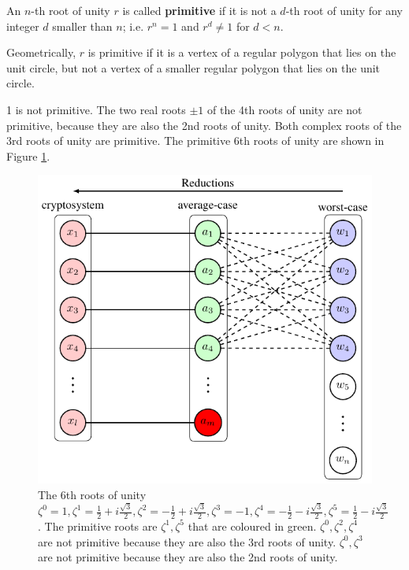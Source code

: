 \documentclass[../main.tex]{subfiles}
\begin{document}
\begin{definition}
An $n$-th root of unity $r$ is called \textbf{primitive}\reversemarginpar
{}
 if it is not a $d$-th root of unity for any integer $d$ smaller than $n$; i.e. $r^n=1$ and $r^d \neq 1$ for $d < n$. %
\end{definition}

Geometrically, $r$ is primitive if it is a vertex of a regular polygon that lies on the unit circle, but not a vertex of a smaller regular polygon that lies on the unit circle.  

\begin{example}
1 is not primitive. The two real roots $\pm 1$ of the 4th roots of unity are not primitive, because they are also the 2nd roots of unity. Both complex roots of the 3rd roots of unity are primitive. The primitive 6th roots of unity are shown in Figure \ref{fig:primitive roots}.
\end{example}

\begin{figure}[h]
    \centering
    \includegraphics[page=8]{images/Lattice_crypto_tikz_folder.pdf}
    \caption{The 6th roots of unity $\zeta^0=1,\zeta^1=\frac{1}{2}+i\frac{\sqrt{3}}{2},\zeta^2=-\frac{1}{2}+i\frac{\sqrt{3}}{2},\zeta^3=-1, \zeta^4=-\frac{1}{2}-i\frac{\sqrt{3}}{2},\zeta^5=\frac{1}{2}-i\frac{\sqrt{3}}{2}$. The primitive roots are $\zeta^1,\zeta^5$ that are coloured in green. $\zeta^0,\zeta^2,\zeta^4$ are not primitive because they are also the 3rd roots of unity. $\zeta^0,\zeta^3$ are not primitive because they are also the 2nd roots of unity.}
    \label{fig:primitive roots}
\end{figure}
\end{document}

